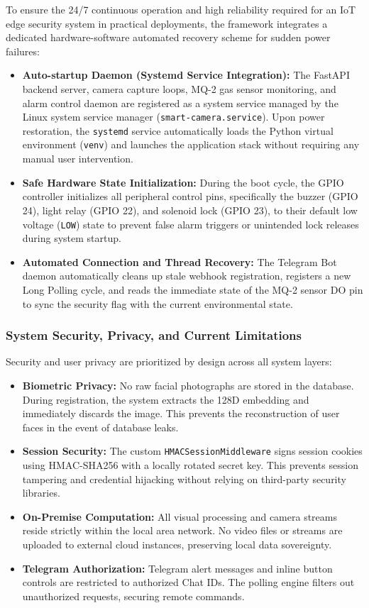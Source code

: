 \documentclass[12pt,a4paper]{article}
\begin{document}
To ensure the 24/7 continuous operation and high reliability required for an IoT edge security system in practical deployments, the framework integrates a dedicated hardware-software automated recovery scheme for sudden power failures:
\begin{itemize}
    \item \textbf{Auto-startup Daemon (Systemd Service Integration):} The FastAPI backend server, camera capture loops, MQ-2 gas sensor monitoring, and alarm control daemon are registered as a system service managed by the Linux system service manager (\texttt{smart-camera.service}). Upon power restoration, the \texttt{systemd} service automatically loads the Python virtual environment (\texttt{venv}) and launches the application stack without requiring any manual user intervention.
    \item \textbf{Safe Hardware State Initialization:} During the boot cycle, the GPIO controller initializes all peripheral control pins, specifically the buzzer (GPIO 24), light relay (GPIO 22), and solenoid lock (GPIO 23), to their default low voltage (\texttt{LOW}) state to prevent false alarm triggers or unintended lock releases during system startup.
    \item \textbf{Automated Connection and Thread Recovery:} The Telegram Bot daemon automatically cleans up stale webhook registration, registers a new Long Polling cycle, and reads the immediate state of the MQ-2 sensor DO pin to sync the security flag with the current environmental state.
\end{itemize}

\subsubsection*{System Security, Privacy, and Current Limitations}
Security and user privacy are prioritized by design across all system layers:
\begin{itemize}
    \item \textbf{Biometric Privacy:} No raw facial photographs are stored in the database. During registration, the system extracts the 128D embedding and immediately discards the image. This prevents the reconstruction of user faces in the event of database leaks.
    \item \textbf{Session Security:} The custom \texttt{HMACSessionMiddleware} signs session cookies using HMAC-SHA256 with a locally rotated secret key. This prevents session tampering and credential hijacking without relying on third-party security libraries.
    \item \textbf{On-Premise Computation:} All visual processing and camera streams reside strictly within the local area network. No video files or streams are uploaded to external cloud instances, preserving local data sovereignty.
    \item \textbf{Telegram Authorization:} Telegram alert messages and inline button controls are restricted to authorized Chat IDs. The polling engine filters out unauthorized requests, securing remote commands.
\end{itemize}
\end{document}
